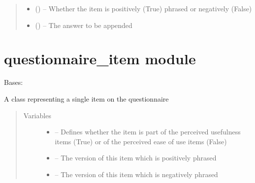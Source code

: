 \documentclass[letterpaper,10pt,english]{sphinxmanual}
\begin{document}
\begin{fulllineitems}
\begin{fulllineitems}
\begin{quote}
\begin{description}
\begin{itemize}
\item {} 
 () -- Whether the item is positively (True) phrased or negatively (False)

\item {} 
 (\href{https://docs.python.org/2/library/string.html\#module-string}{}) -- The answer to be appended

\end{itemize}

\end{description}\end{quote}

\end{fulllineitems}


\end{fulllineitems}



\section{questionnaire\_item module}
\label{\detokenize{questionnaire_item:questionnaire-item-module}}\label{\detokenize{questionnaire_item:module-questionnaire_item}}\label{\detokenize{questionnaire_item::doc}}

\begin{fulllineitems}
\label{\detokenize{questionnaire_item:questionnaire_item.QuestionnaireItem}}
Bases: 

A class representing a single item on the questionnaire
\begin{quote}\begin{description}
\item[{Variables}] \leavevmode\begin{itemize}
\item {} 
 -- Defines whether the item is part of the perceived usefulness items (True) or of the perceived ease of use items (False)

\item {} 
 -- The version of this item which is positively phrased

\item {} 
 -- The version of this item which is negatively phrased

\end{itemize}

\end{description}\end{quote}

\end{fulllineitems}
\end{document}
